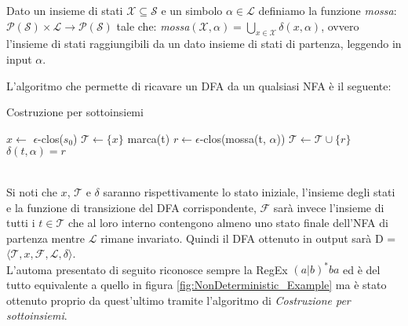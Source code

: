 \begin{definition}[Mossa]
    Dato un insieme di stati $\mathcal{X} \subseteq \mathcal{S}$ e un simbolo $\alpha \in \mathcal{L}$ definiamo la funzione \emph{mossa}: $\mathcal{P(S)} \times \mathcal{L} \longrightarrow \mathcal{P(S)}$ tale che: \emph{mossa}$(\mathcal{X}, \alpha) = \bigcup_{x \in \mathcal{X}}\delta(x, \alpha)$, ovvero l'insieme di stati raggiungibili da un dato insieme di stati di partenza, leggendo in input $\alpha$.
\end{definition}
L'algoritmo che permette di ricavare un DFA da un qualsiasi NFA è il seguente:
\begin{algorithm}
    \caption{Costruzione per sottoinsiemi} \label{alg:SubsetConstruction_Algorithm}
    \begin{algorithmic}
        \State $x \gets$ $\epsilon$-clos($s_0$) 
        \State $\mathcal{T} \gets \{ x \}$                   
        \State marca(t)
        \State $r \gets \epsilon$-clos(mossa(t, $\alpha$))
        \State $\mathcal{T} \gets \mathcal{T} \cup \{r\}$
        \EndIf
        \State $\delta(t, \alpha) = r$  
        \EndFor
        \EndWhile
    \end{algorithmic}
\end{algorithm}\\
Si noti che $x$, $\mathcal{T}$ e $\delta$ saranno rispettivamente lo stato iniziale, l'insieme degli stati e la funzione di transizione del DFA corrispondente, $\mathcal{F}$ sarà invece l'insieme di tutti i $t \in \mathcal{T}$ che al loro interno contengono almeno uno stato finale dell'NFA di partenza mentre $\mathcal{L}$ rimane invariato. Quindi il DFA ottenuto in output sarà D = $\langle \mathcal{T}, x, \mathcal{F}, \mathcal{L}, \delta \rangle$.\bigskip \\
L'automa presentato di seguito riconosce sempre la RegEx $(a|b)^*ba$ ed è del tutto equivalente a quello in figura \ref{fig:NonDeterministic_Example} ma è stato ottenuto proprio da quest'ultimo tramite l'algoritmo di \emph{Costruzione per sottoinsiemi}.
\newpage
